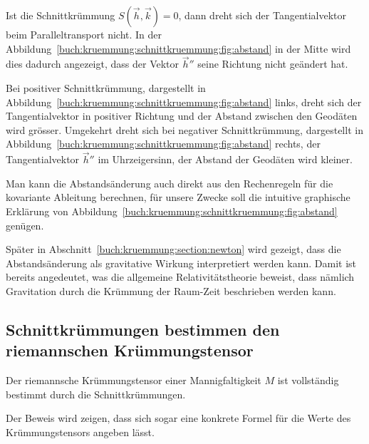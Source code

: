 Ist die Schnittkrümmung $S(\vec{h},\vec{k})=0$, dann dreht sich der
Tangentialvektor beim Paralleltransport nicht.
In der Abbildung~\ref{buch:kruemmung:schnittkruemmung:fig:abstand}
in der Mitte wird dies dadurch angezeigt, dass der Vektor $\vec{h}''$
seine Richtung nicht geändert hat.

Bei positiver Schnittkrümmung, dargestellt in
Abbildung~\ref{buch:kruemmung:schnittkruemmung:fig:abstand}
links, dreht sich der Tangentialvektor in positiver Richtung und der
Abstand zwischen den Geodäten wird grösser.
Umgekehrt dreht sich bei negativer Schnittkrümmung, dargestellt in
Abbildung~\ref{buch:kruemmung:schnittkruemmung:fig:abstand} rechts,
der Tangentialvektor $\vec{h}''$ im Uhrzeigersinn, der Abstand
der Geodäten wird kleiner.

Man kann die Abstandsänderung auch direkt aus den Rechenregeln für
die kovariante Ableitung berechnen, für unsere Zwecke soll die
intuitive graphische Erklärung von 
Abbildung~\ref{buch:kruemmung:schnittkruemmung:fig:abstand}
genügen.

Später in Abschnitt~\ref{buch:kruemmung:section:newton} wird gezeigt,
dass die Abstandsänderung als gravitative Wirkung interpretiert
werden kann.
Damit ist bereits angedeutet, was die allgemeine Relativitätstheorie
beweist, dass nämlich Gravitation durch die Krümmung der Raum-Zeit
beschrieben werden kann.

%
%
\subsection{Schnittkrümmungen bestimmen den riemannschen Krümmungstensor}

\begin{satz}
Der riemannsche Krümmungstensor einer Mannigfaltigkeit $M$
ist vollständig bestimmt durch die Schnittkrümmungen.
\end{satz}

Der Beweis wird zeigen, dass sich sogar eine konkrete Formel
für die Werte des Krümmungstensors angeben lässt.

